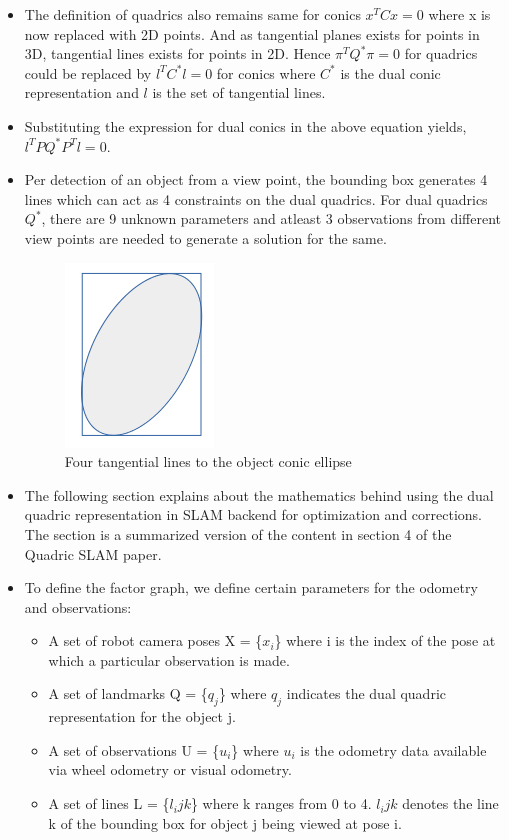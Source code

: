 \documentclass{article}
\begin{document}
\begin{itemize}
\item The definition of quadrics also remains same for conics $x^{T}Cx = 0$ where x is now replaced with 2D points. And as tangential planes exists for points in 3D, tangential lines exists for points in 2D. Hence $\pi^{T}Q^{*}\pi = 0$ for quadrics could be replaced by $l^{T} C^{*} l = 0$ for conics where $C^{*}$ is the dual conic representation and $l$ is the set of tangential lines.
\item Substituting the expression for dual conics in the above equation yields, $l^{T} P Q^{*} P^{T} l = 0$.
\item Per detection of an object from a view point, the bounding box generates 4 lines which can act as 4 constraints on the dual quadrics. For dual quadrics $Q^{*}$, there are 9 unknown parameters and atleast 3 observations from different view points are needed to generate a solution for the same.
\begin{figure}[H]
    \centering
    \includegraphics{Images/bbox.png}
    \caption{Four tangential lines to the object conic ellipse}
    \label{fig:bbox}
\end{figure}

\item The following section explains about the mathematics behind using the dual quadric representation in SLAM backend for optimization and corrections. The section is a summarized version of the content in section 4 of the Quadric SLAM paper\cite{sünderhauf2017dual}.

\item To define the factor graph, we define certain parameters for the odometry and observations:
\begin{itemize}
    \item A set of robot camera poses X = \{$x_i$\} where i is the index of the pose at which a particular observation is made.
    \item A set of landmarks Q = \{$q_j$\} where $q_j$ indicates the dual quadric representation for the object j.
    \item A set of observations U = \{$u_i$\} where $u_i$ is the odometry data available via wheel odometry or visual odometry.
    \item A set of lines L = \{$l_ijk$\} where k ranges from 0 to 4. $l_ijk$ denotes the line k of the bounding box for object j being viewed at pose i.
\end{itemize}


\end{itemize}
\end{document}
